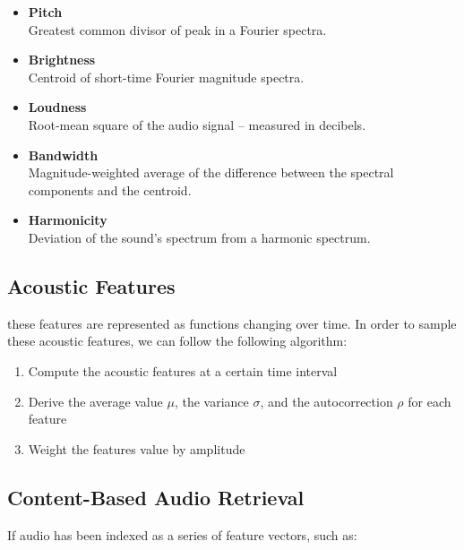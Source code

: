 \documentclass{article}
\begin{document}
\begin{itemize}
	\item \textbf{Pitch}
	\vspace{.2cm} \\
	Greatest common divisor of peak in a Fourier spectra.
	
	\item \textbf{Brightness}
	\vspace{.2cm} \\
	Centroid of short-time Fourier magnitude spectra.
	
	\item \textbf{Loudness}
	\vspace{.2cm} \\
	Root-mean square of the audio signal -- measured in decibels.
	
	\item \textbf{Bandwidth}
	\vspace{.2cm} \\
	Magnitude-weighted average of the difference between the spectral components and the centroid.
	
	\item \textbf{Harmonicity}
	\vspace{,2cm} \\
	Deviation of the sound's spectrum from a harmonic spectrum.
\end{itemize}

\subsection{Acoustic Features}
these features are represented as functions changing over time. In order to sample these acoustic features, we can follow the following algorithm:

\begin{enumerate}
	\item Compute the acoustic features at a certain time interval
	\item Derive the average value $\mu$, the variance $\sigma$, and the autocorrection $\rho$ for each feature
	\item Weight the features value by amplitude
\end{enumerate}

\subsection{Content-Based Audio Retrieval}
If audio has been indexed as a series of feature vectors, such as:
\end{document}
